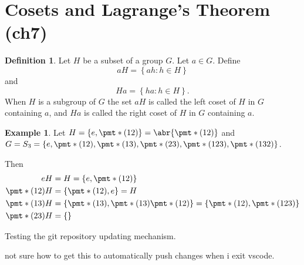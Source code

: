 \documentclass[11pt]{article}
\newcommand{\cbr}[1]{\left\{#1\right\}}
\theoremstyle{remark}
\theoremstyle{definition}
\newtheorem{definition}{Definition}[section]
\theoremstyle{remark}
\theoremstyle{definition}
\newtheorem*{example}{Example}
\theoremstyle{remark}
\begin{document}
\section{Cosets and Lagrange's Theorem (ch7)}

\begin{definition}
  Let $H$ be a subset of a group $G$. Let $a\in G$. Define $$aH = \cbr{ah : h\in H}$$ and $$Ha = \cbr{ha : h\in H}.$$ When $H$ is a subgroup of $G$ the set $aH$ is called the left coset of $H$ in $G$ containing $a$, and $Ha$ is called the right coset of $H$ in $G$ containing $a$.
\end{definition}

\begin{example}
  Let $H = \cbr{e,\pmt*{(12)}} = \abr{\pmt*{(12)}}$ and $G = S_3 = \cbr{e,\pmt*{(12)}, \pmt*{(13)}, \pmt*{(23)}, \pmt*{(123)}, \pmt*{(132)} }$.

  Then \begin{align*}
    eH &= H = \cbr{e,\pmt*{(12)}}\\
    \pmt*{(12)}H &= \cbr{\pmt*{(12)},e} = H\\ 
    \pmt*{(13)}H &= \cbr{\pmt*{(13)}, \pmt*{(13)}\pmt*{(12)}} = \cbr{\pmt*{(12)}, \pmt*{(123)}} \\
    \pmt*{(23)}H &= \cbr{}
  \end{align*}
\end{example}

Testing the git repository updating mechanism.

not sure how to get this to automatically push changes when i exit vscode.
\end{document}
